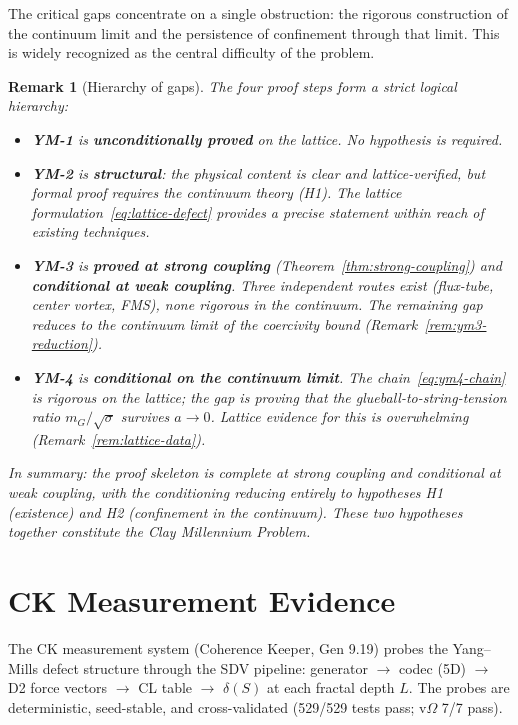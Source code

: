 \documentclass[11pt]{article}
\newtheorem{remark}[theorem]{Remark}
\begin{document}
The critical gaps concentrate on a single obstruction: the rigorous
construction of the continuum limit and the persistence of
confinement through that limit.  This is widely recognized as the
central difficulty of the problem.

\begin{remark}[Hierarchy of gaps]
\label{rem:gap-hierarchy}
The four proof steps form a strict logical hierarchy:
\begin{itemize}
  \item \textbf{YM-1} is \textbf{unconditionally proved} on the lattice.
    No hypothesis is required.
  \item \textbf{YM-2} is \textbf{structural}: the physical content is
    clear and lattice-verified, but formal proof requires the continuum
    theory (H1).  The lattice formulation~\eqref{eq:lattice-defect}
    provides a precise statement within reach of existing techniques.
  \item \textbf{YM-3} is \textbf{proved at strong coupling}
    (Theorem~\ref{thm:strong-coupling}) and \textbf{conditional at weak
    coupling}.  Three independent routes exist (flux-tube, center vortex,
    FMS), none rigorous in the continuum.  The remaining gap reduces to
    the continuum limit of the coercivity bound
    (Remark~\ref{rem:ym3-reduction}).
  \item \textbf{YM-4} is \textbf{conditional on the continuum limit}.
    The chain~\eqref{eq:ym4-chain} is rigorous on the lattice; the gap is
    proving that the glueball-to-string-tension ratio
    $m_G/\sqrt{\sigma}$ survives $a \to 0$.  Lattice evidence for this
    is overwhelming (Remark~\ref{rem:lattice-data}).
\end{itemize}
In summary: the proof skeleton is complete at strong coupling and
conditional at weak coupling, with the conditioning reducing entirely to
hypotheses H1 (existence) and H2 (confinement in the continuum).  These
two hypotheses together constitute the Clay Millennium Problem.
\end{remark}

\section{CK Measurement Evidence}
\label{sec:ck}

The CK measurement system (Coherence Keeper, Gen 9.19) probes the
Yang--Mills defect structure through the SDV pipeline: generator
$\to$ codec (5D) $\to$ D2 force vectors $\to$ CL table $\to$
$\delta(S)$ at each fractal depth $L$.  The probes are deterministic,
seed-stable, and cross-validated (529/529 tests pass; v$\Omega$ 7/7
pass).
\end{document}
